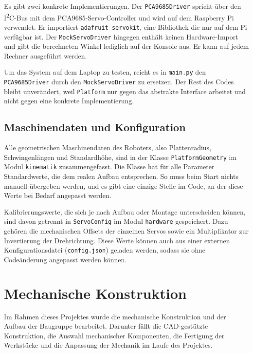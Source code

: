 \documentclass[11pt, a4paper]{scrreprt}
\begin{document}
Es gibt zwei konkrete Implementierungen. Der \texttt{PCA9685Driver} spricht
über den I\textsuperscript{2}C-Bus mit dem PCA9685-Servo-Controller und
wird auf dem Raspberry Pi verwendet. Er importiert \texttt{adafruit\_servokit},
eine Bibliothek die nur auf dem Pi verfügbar ist. Der \texttt{MockServoDriver}
hingegen enthält keinen Hardware-Import und gibt die berechneten Winkel
lediglich auf der Konsole aus. Er kann auf jedem Rechner ausgeführt werden.

Um das System auf dem Laptop zu testen, reicht es in \texttt{main.py}
den \texttt{PCA9685Driver} durch den \texttt{MockServoDriver} zu ersetzen.
Der Rest des Codes bleibt unverändert, weil \texttt{Platform} nur gegen
das abstrakte Interface arbeitet und nicht gegen eine konkrete Implementierung.

\section{Maschinendaten und Konfiguration}

Alle geometrischen Maschinendaten des Roboters, also Plattenradius,
Schwingenlängen und Standardhöhe, sind in der Klasse \texttt{PlatformGeometry}
im Modul \texttt{kinematik} zusammengefasst. Die Klasse hat für alle
Parameter Standardwerte, die dem realen Aufbau entsprechen. So muss
beim Start nichts manuell übergeben werden, und es gibt eine einzige
Stelle im Code, an der diese Werte bei Bedarf angepasst werden.

Kalibrierungswerte, die sich je nach Aufbau oder Montage unterscheiden
können, sind davon getrennt in \texttt{ServoConfig} im Modul \texttt{hardware}
gespeichert. Dazu gehören die mechanischen Offsets der einzelnen Servos
sowie ein Multiplikator zur Invertierung der Drehrichtung. Diese Werte
können auch aus einer externen Konfigurationsdatei (\texttt{config.json})
geladen werden, sodass sie ohne Codeänderung angepasst werden können.

\chapter{Mechanische Konstruktion}

Im Rahmen dieses Projektes wurde die mechanische Konstruktion und der Aufbau der Baugruppe bearbeitet. Darunter fällt die CAD-gestützte Konstruktion, die Auswahl mechanischer Komponenten, die Fertigung der Werkstücke und die Anpassung der Mechanik im Laufe des Projektes.
\end{document}
